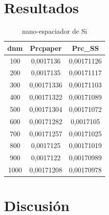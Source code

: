 \section{Resultados}
\begin{table}[H]
	\centering
		\begin{tabular}{|c|c|c|}
		\hline
		dnm&Prcpaper&Prc\_SS\\ \hline 
		100&0,0017136&0,00171126\\ \hline 
		200&0,0017135&0,00171117\\ \hline 
		300&0,00171336&0,00171103\\ \hline 
		400&0,00171322&0,00171089\\ \hline 
		500&0,00171304&0,00171072\\ \hline 
		600&0,00171282&0,0017105\\ \hline 
		700&0,00171257&0,00171025\\ \hline 
		800&0,0017125&0,00171019\\ \hline 
		900&0,0017122&0,00170989\\ \hline 
		1000&0,00171208&0,00170978\\ \hline
		\end{tabular}
	\caption{nano-espaciador de Si}
	\label{tab:nanoEspaciadorDeSi}
\end{table}

\section{Discusión}